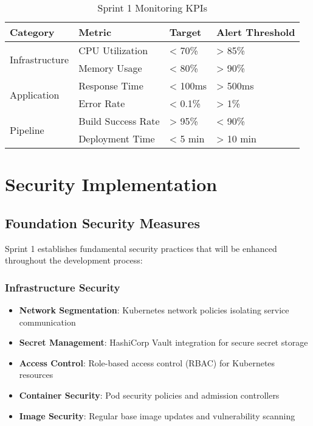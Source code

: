\begin{table}[H]
\centering
\caption{Sprint 1 Monitoring KPIs}
\begin{tabular}{|p{3cm}|p{3cm}|p{3cm}|p{3cm}|}
\hline
\textbf{Category} & \textbf{Metric} & \textbf{Target} & \textbf{Alert Threshold} \\
\hline
\multirow{2}{*}{Infrastructure} & CPU Utilization & < 70\% & > 85\% \\
\cline{2-4}
 & Memory Usage & < 80\% & > 90\% \\
\hline
\multirow{2}{*}{Application} & Response Time & < 100ms & > 500ms \\
\cline{2-4}
 & Error Rate & < 0.1\% & > 1\% \\
\hline
\multirow{2}{*}{Pipeline} & Build Success Rate & > 95\% & < 90\% \\
\cline{2-4}
 & Deployment Time & < 5 min & > 10 min \\
\hline
\end{tabular}
\end{table}

\section{Security Implementation}

\subsection{Foundation Security Measures}

Sprint 1 establishes fundamental security practices that will be enhanced throughout the development process:

\subsubsection{Infrastructure Security}

\begin{itemize}
    \item \textbf{Network Segmentation}: Kubernetes network policies isolating service communication
    \item \textbf{Secret Management}: HashiCorp Vault integration for secure secret storage
    \item \textbf{Access Control}: Role-based access control (RBAC) for Kubernetes resources
    \item \textbf{Container Security}: Pod security policies and admission controllers
    \item \textbf{Image Security}: Regular base image updates and vulnerability scanning
\end{itemize}


